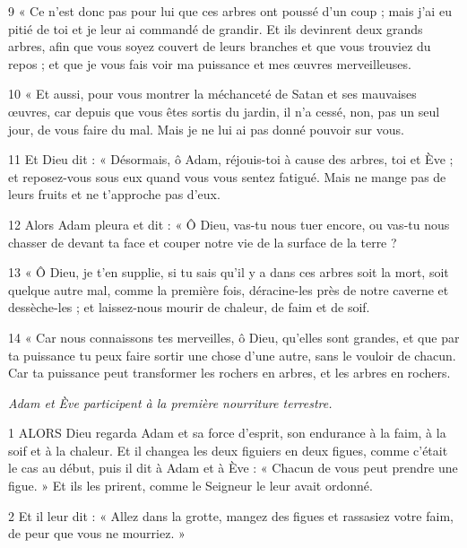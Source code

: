 \par 9 « Ce n'est donc pas pour lui que ces arbres ont poussé d'un coup ; mais j'ai eu pitié de toi et je leur ai commandé de grandir. Et ils devinrent deux grands arbres, afin que vous soyez couvert de leurs branches et que vous trouviez du repos ; et que je vous fais voir ma puissance et mes œuvres merveilleuses.

\par 10 « Et aussi, pour vous montrer la méchanceté de Satan et ses mauvaises œuvres, car depuis que vous êtes sortis du jardin, il n'a cessé, non, pas un seul jour, de vous faire du mal. Mais je ne lui ai pas donné pouvoir sur vous.

\par 11 Et Dieu dit : « Désormais, ô Adam, réjouis-toi à cause des arbres, toi et Ève ; et reposez-vous sous eux quand vous vous sentez fatigué. Mais ne mange pas de leurs fruits et ne t’approche pas d’eux.

\par 12 Alors Adam pleura et dit : « Ô Dieu, vas-tu nous tuer encore, ou vas-tu nous chasser de devant ta face et couper notre vie de la surface de la terre ?

\par 13 « Ô Dieu, je t'en supplie, si tu sais qu'il y a dans ces arbres soit la mort, soit quelque autre mal, comme la première fois, déracine-les près de notre caverne et dessèche-les ; et laissez-nous mourir de chaleur, de faim et de soif.

\par 14 « Car nous connaissons tes merveilles, ô Dieu, qu'elles sont grandes, et que par ta puissance tu peux faire sortir une chose d'une autre, sans le vouloir de chacun. Car ta puissance peut transformer les rochers en arbres, et les arbres en rochers.


\par \textit{Adam et Ève participent à la première nourriture terrestre.}

\par 1 ALORS Dieu regarda Adam et sa force d'esprit, son endurance à la faim, à la soif et à la chaleur. Et il changea les deux figuiers en deux figues, comme c'était le cas au début, puis il dit à Adam et à Ève : « Chacun de vous peut prendre une figue. » Et ils les prirent, comme le Seigneur le leur avait ordonné.

\par 2 Et il leur dit : « Allez dans la grotte, mangez des figues et rassasiez votre faim, de peur que vous ne mourriez. »

